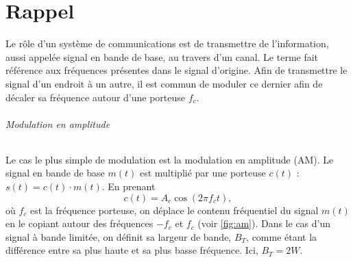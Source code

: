 \documentclass [a4paper, 11pt] {article}
\begin{document}
    \makeseancetitle
    \thispagestyle{firstpage}
    
    \part*{Rappel}
    
    Le rôle d'un système de communications est de transmettre de l'information, aussi appelée signal en bande de base, au travers d'un canal. Le terme  fait référence aux fréquences présentes dans le signal d'origine. Afin de transmettre le signal d'un endroit à un autre, il est commun de moduler ce dernier afin de décaler sa fréquence autour d'une porteuse $f_c$.
    
    \paragraph{Modulation en amplitude} Le cas le plus simple de modulation est la modulation en amplitude (AM). Le signal en bande de base $m(t)$ est multiplié par une porteuse $c(t)$ : $s(t) = c(t)\cdot m(t)$. En prenant
    \begin{equation}
        c(t) = A_c \cos(2\pi f_c t),
    \end{equation}
    où $f_c$ est la fréquence porteuse, on déplace le contenu fréquentiel du signal $m(t)$ en le copiant autour des fréquences $-f_c$ et $f_c$ (voir \autoref{fig:am}). Dans le cas d'un signal à bande limitée, on définit sa largeur de bande, $B_T$, comme étant la différence entre sa plus haute et sa plus basse fréquence. Ici, $B_T = 2W$.
    
\end{document}
